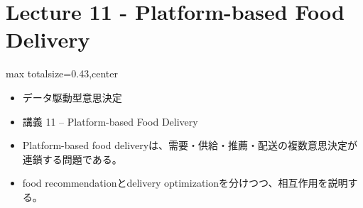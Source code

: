 \section*{Lecture 11 - Platform-based Food Delivery}

\clearpage
{}
\begin{minipage}[t]{0.405\textwidth}
\begin{adjustbox}{max totalsize={\textwidth}{0.43\textheight},center}
\begin{minipage}{\textwidth}\scriptsize
{}\begin{itemize}
\item データ駆動型意思決定
\item 講義 11 – Platform-based Food Delivery
\end{itemize}\begin{itemize}
\item Platform-based food deliveryは、需要・供給・推薦・配送の複数意思決定が連鎖する問題である。
\item food recommendationとdelivery optimizationを分けつつ、相互作用を説明する。
\end{itemize}
\end{minipage}
\end{adjustbox}
\end{minipage}\hfill
